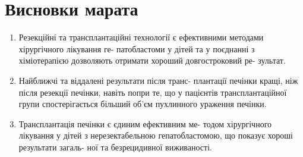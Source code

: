 \chapter{Висновки марата}
\begin{enumerate}
\item Резекційні та трансплантаційні технології є ефективними методами хірургічного лікування ге- патобластоми у дітей та у поєднанні з хіміотерапією дозволяють отримати хороший довгостроковий ре- зультат.
\item  Найближчі та віддалені результати після транс- плантації печінки кращі, ніж після резекції печінки, навіть попри те, що у пацієнтів трансплантаційної групи спостерігається більший об’єм пухлинного ураження печінки.
\item  Трансплантація печінки є єдиним ефективним ме- тодом хірургічного лікування у дітей з нерезектабельною гепатобластомою, що показує хороші результати загаль- ної та безрецидивної виживаності.
\end{enumerate}